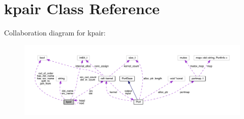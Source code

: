 \hypertarget{classkpair}{}\section{kpair Class Reference}
\label{classkpair}


Collaboration diagram for kpair\+:
\nopagebreak
\begin{figure}[H]
\begin{center}
\leavevmode
\includegraphics[width=350pt]{classkpair__coll__graph}
\end{center}
\end{figure}

